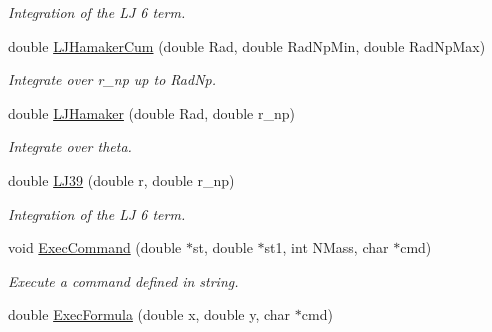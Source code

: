 \begin{DoxyCompactItemize}
\begin{DoxyCompactList}\small\item\em Integration of the LJ 6 term. \end{DoxyCompactList}\item 
double \hyperlink{classMatematica_a51d698727558e19853a9b5b57d408cce}{L\+J\+Hamaker\+Cum} (double Rad, double Rad\+Np\+Min, double Rad\+Np\+Max)\hypertarget{classMatematica_a51d698727558e19853a9b5b57d408cce}{}\label{classMatematica_a51d698727558e19853a9b5b57d408cce}

\begin{DoxyCompactList}\small\item\em Integrate over r\+\_\+np up to Rad\+Np. \end{DoxyCompactList}\item 
double \hyperlink{classMatematica_a1a96fd9eb322682d6239edae5786df00}{L\+J\+Hamaker} (double Rad, double r\+\_\+np)\hypertarget{classMatematica_a1a96fd9eb322682d6239edae5786df00}{}\label{classMatematica_a1a96fd9eb322682d6239edae5786df00}

\begin{DoxyCompactList}\small\item\em Integrate over theta. \end{DoxyCompactList}\item 
double \hyperlink{classMatematica_a1dad46d7d3646dfe812d20dd22e06513}{L\+J39} (double r, double r\+\_\+np)\hypertarget{classMatematica_a1dad46d7d3646dfe812d20dd22e06513}{}\label{classMatematica_a1dad46d7d3646dfe812d20dd22e06513}

\begin{DoxyCompactList}\small\item\em Integration of the LJ 6 term. \end{DoxyCompactList}\item 
void \hyperlink{classMatematica_ad9ec0b6378fe8077c460449a16404ca7}{Exec\+Command} (double $\ast$st, double $\ast$st1, int N\+Mass, char $\ast$cmd)\hypertarget{classMatematica_ad9ec0b6378fe8077c460449a16404ca7}{}\label{classMatematica_ad9ec0b6378fe8077c460449a16404ca7}

\begin{DoxyCompactList}\small\item\em Execute a command defined in string. \end{DoxyCompactList}\item 
double \hyperlink{classMatematica_aa8b3417ffb15a1c67df01163d9d2fc35}{Exec\+Formula} (double x, double y, char $\ast$cmd)\hypertarget{classMatematica_aa8b3417ffb15a1c67df01163d9d2fc35}{}\label{classMatematica_aa8b3417ffb15a1c67df01163d9d2fc35}


\end{DoxyCompactItemize}
